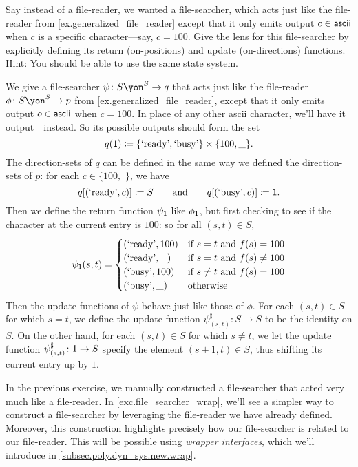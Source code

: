 \documentclass[Book-Poly]{subfiles}
\begin{document}
\begin{exercise} \label{exc.file_searcher}
Say instead of a file-reader, we wanted a file-searcher, which acts just like the file-reader from \cref{ex.generalized_file_reader} except that it only emits output $c\in\mathsf{ascii}$ when $c$ is a specific character---say, $c=100$.
Give the lens for this file-searcher by explicitly defining its return (on-positions) and update (on-directions) functions.
Hint: You should be able to use the same state system.
\begin{solution}
We give a file-searcher $\psi\colon S\yon^S\to q$ that acts just like the file-reader $\phi\colon S\yon^S\to p$ from \cref{ex.generalized_file_reader}, except that it only emits output $o\in\mathsf{ascii}$ when $c=100$.
In place of any other ascii character, we'll have it output $\_$ instead.
So its possible outputs should form the set
\[
    q(\textsf{1})\coloneqq\{\text{`ready'}, \text{`busy'}\}\times\{100,\_\}.
\]
The direction-sets of $q$ can be defined in the same way we defined the direction-sets of $p$: for each $c\in\{100,\_\}$, we have
\[
    q[(\text{`ready'}, c)]\coloneqq S \qquad\text{and}\qquad q[(\text{`busy'}, c)]\coloneqq\textsf{1}.
\]
Then we define the return function $\psi_{\textsf{1}}$ like $\phi_{\textsf{1}}$, but first checking to see if the character at the current entry is $100$: so for all $(s,t)\in S$,
\begin{align*}
  \psi_{\textsf{1}}(s, t) =
  \begin{cases}
    (\text{`ready'}, 100) &\mbox{if $s=t$ and $f(s)=100$}\\
    (\text{`ready'}, \_) &\mbox{if $s=t$ and $f(s)\neq100$}\\
    (\text{`busy'}, 100) &\mbox{if $s\neq t$ and $f(s)=100$}\\
    (\text{`busy'}, \_) &\mbox{otherwise}\\
  \end{cases}
\end{align*}
Then the update functions of $\psi$ behave just like those of $\phi$.
For each $(s,t)\in S$ for which $s=t$, we define the update function $\psi^\sharp_{(s,t)}\colon S\to S$ to be the identity on $S$.
On the other hand, for each $(s,t)\in S$ for which $s\neq t$, we let the update function $\psi^\sharp_{(s,t)}\colon \textsf{1}\to S$ specify the element $(s+1, t)\in S$, thus shifting its current entry up by $1$.
\end{solution}
\end{exercise}

In the previous exercise, we manually constructed a file-searcher that acted very much like a file-reader.
In \cref{exc.file_searcher_wrap}, we'll see a simpler way to construct a file-searcher by leveraging the file-reader we have already defined.
Moreover, this construction highlights precisely how our file-searcher is related to our file-reader.
This will be possible using \emph{wrapper interfaces}, which we'll introduce in \cref{subsec.poly.dyn_sys.new.wrap}.
\end{document}
